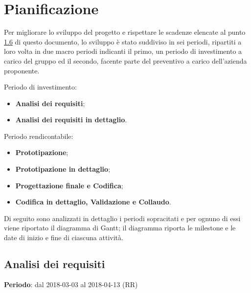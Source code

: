\newpage
\section{Pianificazione}

Per migliorare lo sviluppo del progetto e rispettare le scadenze elencate al punto \hyperref[Scadenze]{1.6} di questo documento, lo sviluppo è stato suddiviso in sei periodi, ripartiti a loro volta in due macro periodi indicanti il primo, un periodo di investimento a carico del gruppo \Gruppo ed il secondo, facente parte del preventivo a carico dell'azienda proponente.

Periodo di investimento:
\begin{itemize}
\item \textbf{Analisi dei requisiti};
\item \textbf{Analisi dei requisiti in dettaglio}.
\end{itemize}
Periodo rendicontabile:
\begin{itemize}
\item \textbf{Prototipazione};
\item \textbf{Prototipazione in dettaglio};
\item \textbf{Progettazione finale e Codifica};
\item \textbf{Codifica in dettaglio, Validazione e Collaudo}.
\end{itemize}
Di seguito sono analizzati in dettaglio i periodi sopracitati e per ognuno di essi viene riportato il diagramma di Gantt; il diagramma riporta le milestone e le date di inizio e fine di ciascuna attività.

\subsection{Analisi dei requisiti}
\textbf{Periodo}: dal 2018-03-03 al 2018-04-13 (RR)\\

